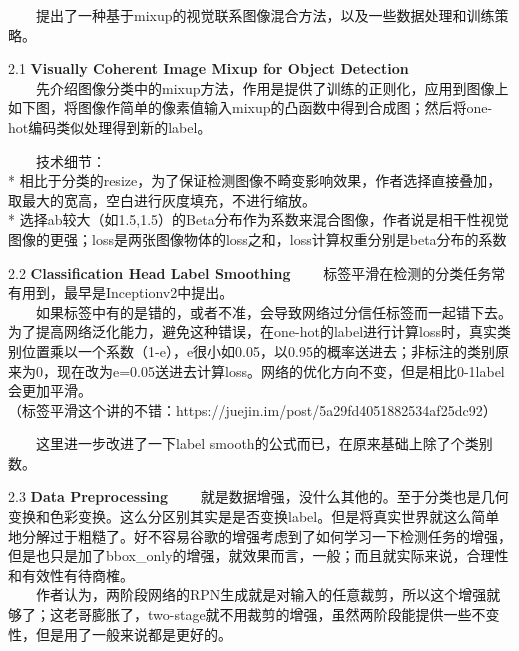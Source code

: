   提出了一种基于mixup的视觉联系图像混合方法，以及一些数据处理和训练策略。

2.1 \textbf{Visually Coherent Image Mixup for Object Detection}\\
  先介绍图像分类中的mixup方法，作用是提供了训练的正则化，应用到图像上如下图，将图像作简单的像素值输入mixup的凸函数中得到合成图；然后将one-hot编码类似处理得到新的label。

\begin{figure}
\centering
\caption{}
\end{figure}

  技术细节：\\
*
相比于分类的resize，为了保证检测图像不畸变影响效果，作者选择直接叠加，取最大的宽高，空白进行灰度填充，不进行缩放。\\
*
选择ab较大（如1.5,1.5）的Beta分布作为系数来混合图像，作者说是相干性视觉图像的更强；loss是两张图像物体的loss之和，loss计算权重分别是beta分布的系数

\begin{figure}
\centering
\caption{}
\end{figure}

2.2 \textbf{Classification Head Label Smoothing}
  标签平滑在检测的分类任务常有用到，最早是Inceptionv2中提出。\\
  如果标签中有的是错的，或者不准，会导致网络过分信任标签而一起错下去。为了提高网络泛化能力，避免这种错误，在one-hot的label进行计算loss时，真实类别位置乘以一个系数（1-e），e很小如0.05，以0.95的概率送进去；非标注的类别原来为0，现在改为e=0.05送进去计算loss。网络的优化方向不变，但是相比0-1label会更加平滑。\\
（标签平滑这个讲的不错：https://juejin.im/post/5a29fd4051882534af25dc92）

\begin{figure}
\centering
\caption{}
\end{figure}

  这里进一步改进了一下label smooth的公式而已，在原来基础上除了个类别数。

2.3 \textbf{Data Preprocessing}
  就是数据增强，没什么其他的。至于分类也是几何变换和色彩变换。这么分区别其实是是否变换label。但是将真实世界就这么简单地分解过于粗糙了。好不容易谷歌的增强考虑到了如何学习一下检测任务的增强，但是也只是加了bbox\_only的增强，就效果而言，一般；而且就实际来说，合理性和有效性有待商榷。\\
  作者认为，两阶段网络的RPN生成就是对输入的任意裁剪，所以这个增强就够了；这老哥膨胀了，two-stage就不用裁剪的增强，虽然两阶段能提供一些不变性，但是用了一般来说都是更好的。

